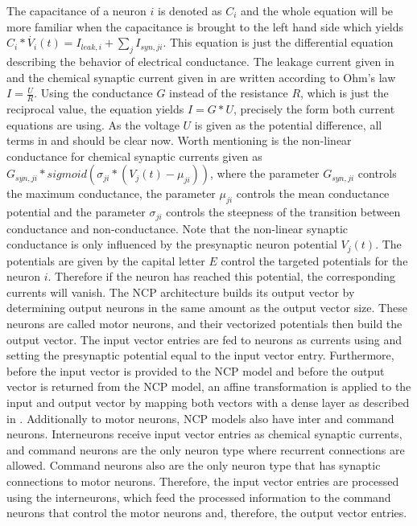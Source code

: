 \documentclass[draft,final]{vutinfth} %
\begin{document}
    The capacitance of a neuron $i$ is denoted as $C_i$ and the whole equation will be more familiar when the capacitance is brought to the left hand side which yields $C_i * \dot{V_i}(t) = I_{leak,i} + \sum_j{I_{syn,ji}}$.
    This equation is just the differential equation describing the behavior of electrical conductance.
    The leakage current given in  and the chemical synaptic current given in  are written according to Ohm's law $I = \frac{U}{R}$.
    Using the conductance $G$ instead of the resistance $R$, which is just the reciprocal value, the equation yields $I = G * U$, precisely the form both current equations are using.
    As the voltage $U$ is given as the potential difference, all terms in  and  should be clear now.
    Worth mentioning is the non-linear conductance for chemical synaptic currents given as $G_{syn,ji} * sigmoid(\sigma_{ji}*(V_j(t)-\mu_{ji}))$, where the parameter $G_{syn,ji}$ controls the maximum conductance, the parameter $\mu_{ji}$ controls the mean conductance potential and the parameter $\sigma_{ji}$ controls the steepness of the transition between conductance and non-conductance.
    Note that the non-linear synaptic conductance is only influenced by the presynaptic neuron potential $V_j(t)$.
    The potentials are given by the capital letter $E$ control the targeted potentials for the neuron $i$. Therefore if the neuron has reached this potential, the corresponding currents will vanish.
    The NCP architecture builds its output vector by determining output neurons in the same amount as the output vector size.
    These neurons are called motor neurons, and their vectorized potentials then build the output vector.
    The input vector entries are fed to neurons as currents using  and setting the presynaptic potential equal to the input vector entry.
    Furthermore, before the input vector is provided to the NCP model and before the output vector is returned from the NCP model, an affine transformation is applied to the input and output vector by mapping both vectors with a dense layer as described in .
    Additionally to motor neurons, NCP models also have inter and command neurons.
    Interneurons receive input vector entries as chemical synaptic currents, and command neurons are the only neuron type where recurrent connections are allowed.
    Command neurons also are the only neuron type that has synaptic connections to motor neurons.
    Therefore, the input vector entries are processed using the interneurons, which feed the processed information to the command neurons that control the motor neurons and, therefore, the output vector entries.
\end{document}
